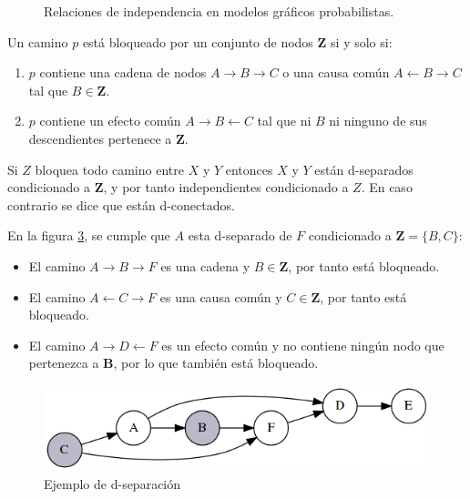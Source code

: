 \begin{figure}[h!]
\begin{subfigure}{0.40\linewidth}
		\label{fig:collider-indep}
	\end{subfigure}		
	\caption{
		Relaciones de independencia en modelos gráficos probabilistas.
	}
	\label{fig:connections-indep}
\end{figure}

\begin{dfn}
	Un camino $p$ está bloqueado por un conjunto de nodos $\textbf{Z}$ si y solo si:
	\begin{enumerate}
		\item $p$ contiene una cadena de nodos $A \rightarrow B \rightarrow C$ o una causa común $A \leftarrow B \rightarrow C$ tal que $B \in \textbf{Z}$.
		\item $p$ contiene un efecto común $A \rightarrow B \leftarrow C$ tal que ni $B$ ni ninguno de sus descendientes pertenece a $\textbf{Z}$.
	\end{enumerate}
\end{dfn}

\begin{dfn}[d-separación]
	Si $Z$ bloquea todo camino entre $X$ y $Y$ entonces $X$ y $Y$ están d-separados condicionado a $\textbf{Z}$, y por tanto independientes condicionado a $Z$. En caso contrario se dice que están d-conectados.
\end{dfn}
En la figura \ref{fig:d-sep}, se cumple que $A$ esta d-separado de $F$ condicionado a $\textbf{Z}=\{B,C\}$:
\begin{itemize}
	\item El camino $A \rightarrow B \rightarrow F$ es una cadena y $B \in \textbf{Z}$, por tanto está bloqueado.
	\item El camino $A \leftarrow C \rightarrow F$ es una causa común y $C \in \textbf{Z}$, por tanto está bloqueado.
	\item El camino $A \rightarrow D \leftarrow F$ es un efecto común y no contiene ningún nodo que pertenezca a $\textbf{B}$, por lo que también está bloqueado.
\end{itemize}
\begin{figure}[h!]
	\centering
	\includegraphics[width=0.8\linewidth]{./images/Chapter 2/d-separation.png}
	\caption{Ejemplo de d-separación}
	\label{fig:d-sep}
\end{figure}	

